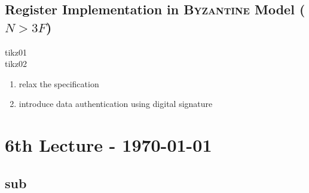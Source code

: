 \documentclass{article}
\begin{document}
\begin{adjustwidth}{2em}{2em}
		\subsection{Register Implementation in \textsc{Byzantine} Model ($N > 3F$)}
		\begin{adjustwidth}{2em}{2em}
			tikz01 \\
			tikz02 \\
			\begin{enumerate}[-]
				\item relax the specification
				\item introduce data authentication using digital signature
			\end{enumerate}
		\end{adjustwidth}
	\end{adjustwidth}
	
	\newpage
	
	\section{6th Lecture - \today}
	\begin{adjustwidth}{2em}{2em}
		\subsection{sub}
		\begin{adjustwidth}{2em}{2em}
		\end{adjustwidth}
	\end{adjustwidth}
\end{document}

